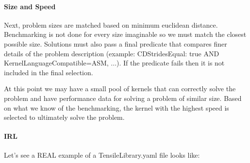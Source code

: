 \documentclass[]{article}
\begin{document}
\paragraph{Size and Speed}

Next, problem sizes are matched based on minimum euclidean distance. Benchmarking is not done for every size imaginable so we must match the closest possible size. Solutions must also pass a final predicate that compares finer details of the problem description (example: CDStridesEqual: true AND KernelLanguageCompatible=ASM, ...). If the predicate fails then it is not included in the final selection.

At this point we may have a small pool of kernels that can correctly solve the problem and have performance data for solving a problem of similar size. Based on what we know of the benchmarking, the kernel with the highest speed is selected to ultimately solve the problem.

\paragraph{IRL}

Let's see a REAL example of a TensileLibrary.yaml file looks like:
\end{document}
